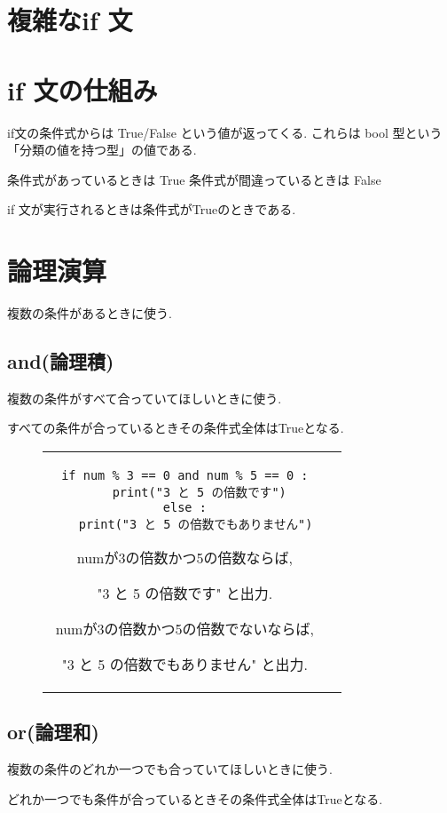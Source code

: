 \documentclass[dvipdfmx]{jsbook}
\newcommand{\info}[2]{\begin{tcolorbox}[colframe=gray, colback=black!10!white, coltitle=white, fonttitle=\bfseries, title={#1}]
{#2}\end{tcolorbox}}
\begin{document}
\section*{複雑なif 文}
\section{if 文の仕組み}
if文の条件式からは True/False という値が返ってくる. これらは bool 型という「分類の値を持つ型」の値である.  \par
条件式があっているときは True
条件式が間違っているときは False \par
if 文が実行されるときは条件式がTrueのときである.
\section{論理演算}
複数の条件があるときに使う.

\subsection{and(論理積)}
複数の条件がすべて合っていてほしいときに使う. \par
すべての条件が合っているときその条件式全体はTrueとなる.

\begin{figure}[htp]
	\begin{tabular}{cc}
		\begin{minipage}{.45\textwidth}
			\begin{lstlisting}[caption=andの例]
if num % 3 == 0 and num % 5 == 0 :
	print("3 と 5 の倍数です")
else :
	print("3 と 5 の倍数でもありません") \end{lstlisting}
		\end{minipage} \hspace{5truemm}
		\begin{minipage}{.45\textwidth}
			\info{説明}{numが3の倍数かつ5の倍数ならば, \par "3 と 5 の倍数です" と出力. \par
				numが3の倍数かつ5の倍数でないならば, \par "3 と 5 の倍数でもありません" と出力.}
		\end{minipage}
	\end{tabular}
\end{figure}

\subsection{or(論理和)}
複数の条件のどれか一つでも合っていてほしいときに使う. \par
どれか一つでも条件が合っているときその条件式全体はTrueとなる.
\end{document}
